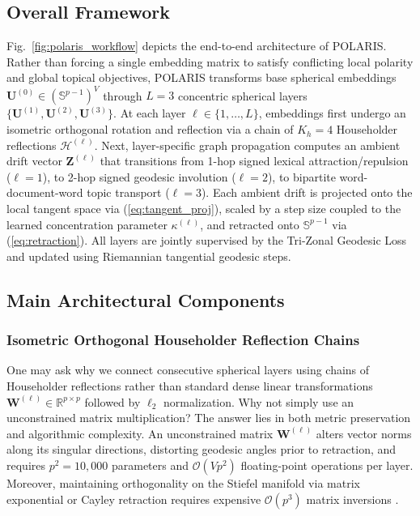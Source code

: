\documentclass[journal]{IEEEtran}
\begin{document}
\subsection{Overall Framework}
Fig.~\ref{fig:polaris_workflow} depicts the end-to-end architecture of POLARIS. Rather than forcing a single embedding matrix to satisfy conflicting local polarity and global topical objectives, POLARIS transforms base spherical embeddings $\mathbf{U}^{(0)} \in (\mathbb{S}^{p-1})^V$ through $L = 3$ concentric spherical layers $\{\mathbf{U}^{(1)}, \mathbf{U}^{(2)}, \mathbf{U}^{(3)}\}$. At each layer $\ell \in \{1, \dots, L\}$, embeddings first undergo an isometric orthogonal rotation and reflection via a chain of $K_h = 4$ Householder reflections $\mathcal{H}^{(\ell)}$. Next, layer-specific graph propagation computes an ambient drift vector $\mathbf{Z}^{(\ell)}$ that transitions from 1-hop signed lexical attraction/repulsion ($\ell = 1$), to 2-hop signed geodesic involution ($\ell = 2$), to bipartite word-document-word topic transport ($\ell = 3$). Each ambient drift is projected onto the local tangent space via (\ref{eq:tangent_proj}), scaled by a step size coupled to the learned concentration parameter $\kappa^{(\ell)}$, and retracted onto $\mathbb{S}^{p-1}$ via (\ref{eq:retraction}). All layers are jointly supervised by the Tri-Zonal Geodesic Loss and updated using Riemannian tangential geodesic steps.

\subsection{Main Architectural Components}

\subsubsection{Isometric Orthogonal Householder Reflection Chains}
One may ask why we connect consecutive spherical layers using chains of Householder reflections rather than standard dense linear transformations $\mathbf{W}^{(\ell)} \in \mathbb{R}^{p \times p}$ followed by $\ell_2$ normalization. Why not simply use an unconstrained matrix multiplication? The answer lies in both metric preservation and algorithmic complexity. An unconstrained matrix $\mathbf{W}^{(\ell)}$ alters vector norms along its singular directions, distorting geodesic angles prior to retraction, and requires $p^2 = 10,000$ parameters and $\mathcal{O}(Vp^2)$ floating-point operations per layer. Moreover, maintaining orthogonality on the Stiefel manifold via matrix exponential or Cayley retraction requires expensive $\mathcal{O}(p^3)$ matrix inversions \cite{mhammedi2017efficient}.
\end{document}
